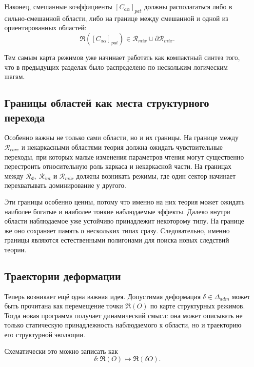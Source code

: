 \documentclass[12pt,a4paper]{article}
\begin{document}
Наконец, смешанные коэффициенты \([C_{a\alpha}]_{pat}\) должны располагаться либо в сильно-смешанной области, либо на границе между смешанной и одной из ориентированных областей:
\begin{equation}
\mathfrak{R}([C_{a\alpha}]_{pat}) \in \mathcal{R}_{mix} \cup \partial \mathcal{R}_{mix}.
\end{equation}

Тем самым карта режимов уже начинает работать как компактный синтез того, что в предыдущих разделах было распределено по нескольким логическим шагам.

\subsection{Границы областей как места структурного перехода}

Особенно важны не только сами области, но и их границы. На границе между \(\mathcal{R}_{core}\) и некаркасными областями теория должна ожидать чувствительные переходы, при которых малые изменения параметров чтения могут существенно перестроить относительную роль каркаса и некаркасной части. На границах между \(\mathcal{R}_{\Phi}\), \(\mathcal{R}_{int}\) и \(\mathcal{R}_{mix}\) должны возникать режимы, где один сектор начинает перехватывать доминирование у другого.

Эти границы особенно ценны, потому что именно на них теория может ожидать наиболее богатые и наиболее тонкие наблюдаемые эффекты. Далеко внутри области наблюдаемое уже устойчиво принадлежит некоторому типу. На границе же оно сохраняет память о нескольких типах сразу. Следовательно, именно границы являются естественными полигонами для поиска новых следствий теории.

\subsection{Траектории деформации}

Теперь возникает ещё одна важная идея. Допустимая деформация \(\delta \in \Delta_{adm}\) может быть прочитана как перемещение точки \(\mathfrak{R}(O)\) по карте структурных режимов. Тогда новая программа получает динамический смысл: она может описывать не только статическую принадлежность наблюдаемого к области, но и траекторию его структурной эволюции.

Схематически это можно записать как
\begin{equation}
\delta : \mathfrak{R}(O) \longmapsto \mathfrak{R}(\delta O).
\end{equation}
\end{document}
